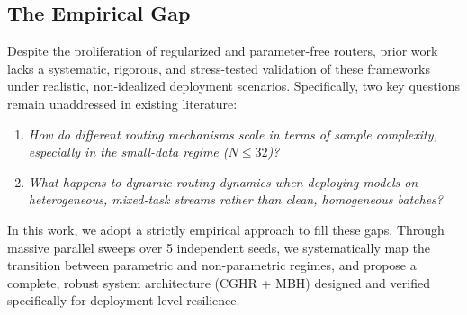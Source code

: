 \subsection{The Empirical Gap}
Despite the proliferation of regularized and parameter-free routers, prior work lacks a systematic, rigorous, and stress-tested validation of these frameworks under realistic, non-idealized deployment scenarios. Specifically, two key questions remain unaddressed in existing literature:
\begin{enumerate}
    \item \emph{How do different routing mechanisms scale in terms of sample complexity, especially in the small-data regime ($N \le 32$)?}
    \item \emph{What happens to dynamic routing dynamics when deploying models on heterogeneous, mixed-task streams rather than clean, homogeneous batches?}
\end{enumerate}
In this work, we adopt a strictly empirical approach to fill these gaps. Through massive parallel sweeps over 5 independent seeds, we systematically map the transition between parametric and non-parametric regimes, and propose a complete, robust system architecture (CGHR + MBH) designed and verified specifically for deployment-level resilience.
